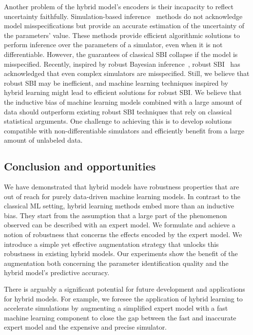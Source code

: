 Another problem of the hybrid model's encoders is their incapacity to reflect uncertainty faithfully. Simulation-based inference~\citep[][SBI]{cranmer2020frontier} methods do not acknowledge model misspecifications but provide an accurate estimation of the uncertainty of the parameters' value. These methods provide efficient algorithmic solutions to perform inference over the parameters of a simulator, even when it is not differentiable. However, the guarantees of classical SBI collapse if the model is misspecified. Recently, inspired by robust Bayesian inference~\citep{cherief2020mmd,knoblauch2019generalized}, robust SBI~\citep{dellaporta2022robust} has acknowledged that even complex simulators are misspecified. Still, we believe that robust SBI may be inefficient, and machine learning techniques inspired by hybrid learning might lead to efficient solutions for robust SBI. We believe that the inductive bias of machine learning models combined with a large amount of data should outperform existing robust SBI techniques that rely on classical statistical arguments. One challenge to achieving this is to develop solutions compatible with non-differentiable simulators and efficiently benefit from a large amount of unlabeled data.

\subsection{Conclusion and opportunities}
We have demonstrated that hybrid models have robustness properties that are out of reach for purely data-driven machine learning models. In contrast to the classical ML setting, hybrid learning methods embed more than an inductive bias. They start from the assumption that a large part of the phenomenon observed can be described with an expert model. We formulate and achieve a notion of robustness that concerns the effects encoded by the expert model. We introduce a simple yet effective augmentation strategy that unlocks this robustness in existing hybrid models. Our experiments show the benefit of the augmentation both concerning the parameter identification quality and the hybrid model's predictive accuracy.

There is arguably a significant potential for future development and applications for hybrid models. For example, we foresee the application of hybrid learning to accelerate simulations by augmenting a simplified expert model with a fast machine learning component to close the gap between the fast and inaccurate expert model and the expensive and precise simulator.

